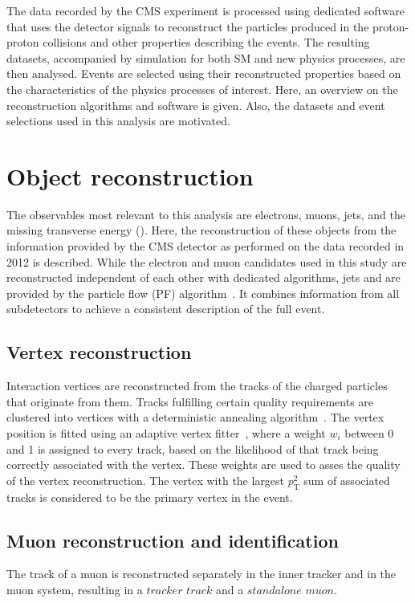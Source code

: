 \label{sec:ana}
The data recorded by the CMS experiment is processed using dedicated software that uses the detector signals to reconstruct the particles produced in the proton-proton collisions and other properties describing the events. The resulting datasets, accompanied by simulation for both SM and new physics processes, are then analysed. Events are selected using their reconstructed properties based on the characteristics of the physics processes of interest. Here, an overview on the reconstruction algorithms and software is given. Also, the datasets and event selections used in this analysis are motivated.
\section{Object reconstruction}
\label{sec:objects}
The observables most relevant to this analysis are electrons, muons, jets, and the missing transverse energy (\MET). Here, the reconstruction of these objects from the information provided by the CMS detector as performed on the data recorded in 2012 is described. While the electron and muon candidates used in this study are reconstructed independent of each other with dedicated algorithms, jets and \MET are provided by the particle flow (PF) algorithm~\cite{CMS-PAS-PFT-09-001}. It combines information from all subdetectors to achieve a consistent description of the full event. 

\subsection{Vertex reconstruction}
Interaction vertices are reconstructed from the tracks of the charged particles that originate from them.
Tracks fulfilling certain quality requirements are clustered into vertices with a deterministic annealing algorithm~\cite{DertermisiticAnnealing,Chatrchyan:2014fea}. The vertex position is fitted using an adaptive vertex fitter~\cite{Fruehwirth:1027031}, where a weight $w_i$ between 0 and 1 is assigned to every track, based on the likelihood of that track being correctly associated with the vertex. These weights are used to asses the quality of the vertex reconstruction. The vertex with the largest $p_\mathrm{T}^2$ sum of associated tracks is considered to be the primary vertex in the event.

\subsection{Muon reconstruction and identification}
The track of a muon is reconstructed separately in the inner tracker and in the muon system, resulting in a $\textit{tracker track}$ and a $\textit{standalone muon}$. 

